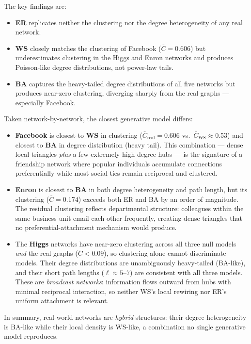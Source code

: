 The key findings are:
\begin{itemize}
    \item \textbf{ER} replicates neither the clustering nor the
          degree heterogeneity of any real network.
    \item \textbf{WS} closely matches the clustering of Facebook
          ($\bar{C} = 0.606$) but underestimates clustering in
          the Higgs and Enron networks and produces Poisson-like
          degree distributions, not power-law tails.
    \item \textbf{BA} captures the heavy-tailed degree distributions
          of all five networks but produces near-zero clustering,
          diverging sharply from the real graphs — especially Facebook.
\end{itemize}
Taken network-by-network, the closest generative model differs:
\begin{itemize}
    \item \textbf{Facebook} is closest to \textbf{WS} in clustering
          ($\bar{C}_{\text{real}} = 0.606$ vs.\ $\bar{C}_{\text{WS}} \approx 0.53$)
          and closest to \textbf{BA} in degree distribution (heavy tail).
          This combination — dense local triangles \textit{plus} a few
          extremely high-degree hubs — is the signature of a friendship
          network where popular individuals accumulate connections
          preferentially while most social ties remain reciprocal and
          clustered.
    \item \textbf{Enron} is closest to \textbf{BA} in both degree
          heterogeneity and path length, but its clustering
          ($\bar{C} = 0.174$) exceeds both ER and BA by an order of
          magnitude.
          The residual clustering reflects departmental structure:
          colleagues within the same business unit email each other
          frequently, creating dense triangles that no preferential-attachment
          mechanism would produce.
    \item The \textbf{Higgs} networks have near-zero clustering across
          all three null models \textit{and} the real graphs
          ($\bar{C} < 0.09$), so clustering alone cannot discriminate
          models.
          Their degree distributions are unambiguously heavy-tailed (BA-like),
          and their short path lengths ($\ell \approx 5$--$7$) are
          consistent with all three models.
          These are \textit{broadcast networks}: information flows outward
          from hubs with minimal reciprocal interaction, so neither WS's
          local rewiring nor ER's uniform attachment is relevant.
\end{itemize}
In summary, real-world networks are \textit{hybrid} structures: their degree
heterogeneity is BA-like while their local density is WS-like, a combination
no single generative model reproduces.

